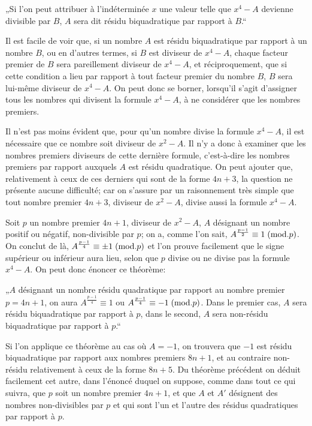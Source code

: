 \par\indent
„Si l'on peut attribuer à l'indéterminée $x$ une valeur telle que $x^4-A$
devienne divisible par $B$, $A$ sera dit résidu biquadratique par rapport à $B$.“
\par\indent
Il est facile de voir que, si un nombre $A$ est résidu biquadratique par
rapport à un nombre $B$, ou en d'autres termes, si $B$ est diviseur de $x^4-A$,
chaque facteur premier de $B$ sera pareillement diviseur de $x^4-A$, et réciproquement,
que si cette condition a lieu par rapport à tout facteur premier
du nombre $B$, $B$ sera lui-même diviseur de $x^4-A$. On peut donc se borner,
lorsqu'il s'agit d'assigner tous les nombres qui divisent la formule $x^4-A$, à ne
considérer que les nombres premiers.
\par\indent
Il n'est pas moins évident que, pour qu'un nombre divise la formule
$x^4-A$, il est nécessaire que ce nombre soit diviseur de $x^2-A$. Il n'y a donc
à examiner que les nombres premiers diviseurs de cette dernière formule,
c'est-à-dire les nombres premiers par rapport auxquels $A$ est résidu quadratique.
On peut ajouter que, relativement à ceux de ces derniers qui sont de la forme
$4n+3$, la question ne présente aucune difficulté; car on s'assure par un raisonnement
très simple que tout nombre premier $4n+3$, diviseur de $x^2-A$, divise
aussi la formule $x^4-A$.
\par\indent
Soit $p$ un nombre premier $4n+1$, diviseur de $x^2-A$, $A$ désignant
un nombre positif ou négatif, non-divisible par $p$; on a, comme l'on sait,
$A^{\frac{p-1}{2}}\equiv1\;(\mathrm{mod}.p)$. On conclut de là, $A^{\frac{p-1}{4}}\equiv\pm1\;(\mathrm{mod}.p)$ et l'on prouve facilement
que le signe supérieur ou inférieur aura lieu, selon que $p$ divise ou ne
divise pas la formule $x^4-A$. On peut donc énoncer ce théorème:
\par\indent
„$A$ désignant un nombre résidu quadratique par rapport au nombre
premier $p=4n+1$, on aura $A^{\frac{p-1}{4}}\equiv1$ ou $A^{\frac{p-1}{4}}\equiv-1\;(\mathrm{mod}.p)$. Dans le premier
cas, $A$ sera résidu biquadratique par rapport à $p$, dans le second, $A$ sera non-résidu
biquadratique par rapport à $p$.“
\par\indent
Si l'on applique ce théorème au cas où $A=-1$, on trouvera que $-1$
est résidu biquadratique par rapport aux nombres premiers $8n+1$, et au contraire
non-résidu relativement à ceux de la forme $8n+5$. Du théorème précédent
on déduit facilement cet autre, dans l'énoncé duquel on suppose, comme
dans tout ce qui suivra, que $p$ soit un nombre premier $4n+1$, et que $A$ et $A'$
désignent des nombres non-divisibles par $p$ et qui sont l'un et l'autre des résidus
quadratiques par rapport à $p$.
